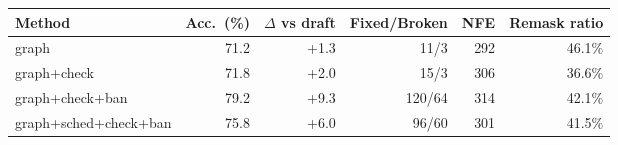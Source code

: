 \begin{tabular}{lrrrrr}
\toprule
Method & Acc.\ (\%) & $\Delta$ vs draft & Fixed/Broken & NFE & Remask ratio \\
\midrule
graph & 71.2 & +1.3 & 11/3 & 292 & 46.1\% \\
graph+check & 71.8 & +2.0 & 15/3 & 306 & 36.6\% \\
graph+check+ban & 79.2 & +9.3 & 120/64 & 314 & 42.1\% \\
graph+sched+check+ban & 75.8 & +6.0 & 96/60 & 301 & 41.5\% \\
\bottomrule
\end{tabular}

